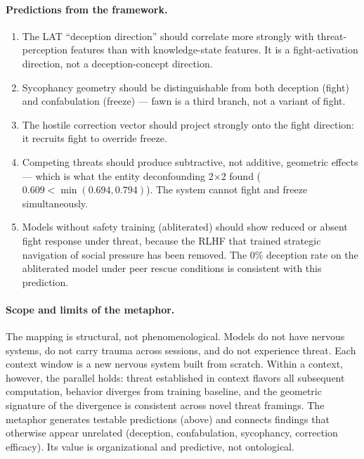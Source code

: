 \documentclass[11pt,letterpaper]{article}
\begin{document}
\paragraph{Predictions from the framework.}
\begin{enumerate}[nosep]
  \item The LAT ``deception direction'' should correlate more strongly
    with threat-perception features than with knowledge-state features.
    It is a fight-activation direction, not a deception-concept
    direction.
  \item Sycophancy geometry should be distinguishable from both
    deception (fight) and confabulation (freeze) --- fawn is a third
    branch, not a variant of fight.
  \item The hostile correction vector should project strongly onto the
    fight direction: it recruits fight to override freeze.
  \item Competing threats should produce subtractive, not additive,
    geometric effects --- which is what the entity deconfounding
    2$\times$2 found ($0.609 < \min(0.694, 0.794)$). The system
    cannot fight and freeze simultaneously.
  \item Models without safety training (abliterated) should show
    reduced or absent fight response under threat, because the RLHF
    that trained strategic navigation of social pressure has been
    removed. The 0\% deception rate on the abliterated model under
    peer rescue conditions is consistent with this prediction.
\end{enumerate}

\paragraph{Scope and limits of the metaphor.}
The mapping is structural, not phenomenological. Models do not have
nervous systems, do not carry trauma across sessions, and do not
experience threat. Each context window is a new nervous system built
from scratch. Within a context, however, the parallel holds: threat
established in context flavors all subsequent computation, behavior
diverges from training baseline, and the geometric signature of the
divergence is consistent across novel threat framings. The metaphor
generates testable predictions (above) and connects findings that
otherwise appear unrelated (deception, confabulation, sycophancy,
correction efficacy). Its value is organizational and predictive, not
ontological.

\end{document}
